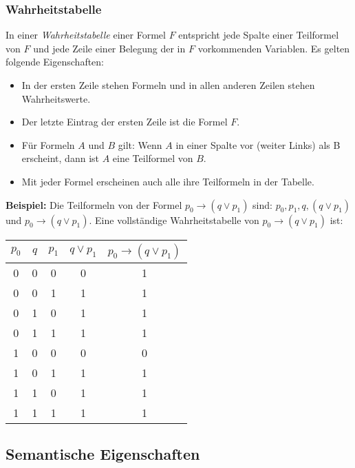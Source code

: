 \subsubsection{Wahrheitstabelle}%
\label{ssub:wahrheitstabelle}
\begin{minipage}{0.9\linewidth}
In einer \textit{Wahrheitstabelle} einer Formel $F$ entspricht jede Spalte einer Teilformel von $F$ und jede Zeile einer Belegung der in $F$ vorkommenden Variablen. Es gelten folgende Eigenschaften:
\begin{itemize}
 \item In der ersten Zeile stehen Formeln und in allen anderen Zeilen stehen Wahrheitswerte.
 \item Der letzte Eintrag der ersten Zeile ist die Formel $F$.
 \item Für Formeln $A$ und $B$ gilt: Wenn $A$ in einer Spalte vor (weiter Links) als B erscheint, dann ist $A$ eine Teilformel von $B$.
  \item Mit jeder Formel erscheinen auch alle ihre Teilformeln in der Tabelle.
\end{itemize}
\end{minipage}
\begin{minipage}{0.9\linewidth}
\textbf{Beispiel: } Die Teilformeln von der Formel $p_0\to (q\lor p_1)$ sind: $p_0,p_1,q,(q\lor p_1)$ und $p_0\to (q\lor p_1)$. Eine vollständige Wahrheitstabelle von $p_0\to (q\lor p_1)$ ist:
\\
        \begin{tabular} {| c | c | c || c | c |}
            \hline
            $p_0$ & $q$ & $p_1$ & $q\lor p_1$ & $p_0\to (q\lor p_1)$ \\ \hline
            0 & 0 & 0 & 0 & 1 \\
            0 & 0 & 1 & 1 & 1\\
            0 & 1 & 0 & 1 & 1\\
            0 & 1 & 1 & 1& 1\\
            1 & 0 & 0 & 0 & 0\\
            1 & 0 & 1 & 1 & 1\\
            1 & 1 & 0 & 1 & 1\\
            1 & 1 & 1 & 1 & 1\\ \hline
        \end{tabular}
\end{minipage}

\subsection{Semantische Eigenschaften}

